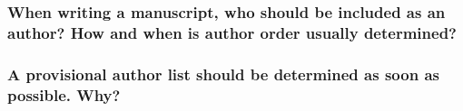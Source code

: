 \documentclass[12pt]{beamer}
\newcommand\gap{\vspace{5mm}}
\begin{document}
\begin{frame}
\it



\end{frame} \begin{frame} 


\end{frame}
\begin{frame}


\frametitle{When writing a manuscript, who should be included as an author? How and when is author order usually determined? }




\end{frame}
\begin{frame}


\frametitle{A provisional author list should be determined as soon as possible. Why?}

\gap




\end{frame}
\end{document}
